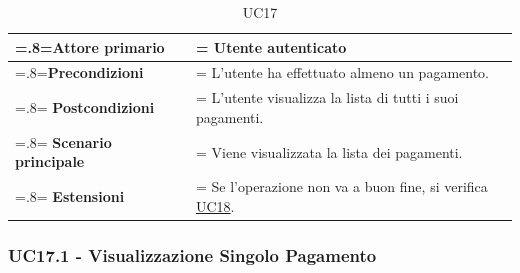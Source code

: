             \begin{table}[H]
                \centering
                \renewcommand{\arraystretch}{1.8}
                \renewcommand\tabularxcolumn[1]{m{#1}}
                \begin{tabularx}{0.9\textwidth} {
                    >{\hsize=.8\hsize\linewidth=\hsize}X
                    >{\hsize=1.2\hsize\linewidth=\hsize}X}
                    \hline
                    \textbf{Attore primario} & Utente autenticato \\
                    \hline
                    \textbf{Precondizioni} & L'utente ha effettuato almeno un pagamento. \\
                    \hline
                    \textbf{Postcondizioni} & L'utente visualizza la lista di tutti i suoi pagamenti. \\
                    \hline
                    \textbf{Scenario principale} & Viene visualizzata la lista dei pagamenti. \\
                    \hline
                    \textbf{Estensioni} & Se l'operazione non va a buon fine, si verifica \hyperref[UC18]{UC18}. \\
                    \hline
                \end{tabularx}
                \caption{UC17}
            \end{table}

        \subsubsection{UC17.1 - Visualizzazione Singolo Pagamento}
        \label{UC17.1}

